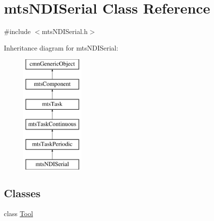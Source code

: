\hypertarget{classmts_n_d_i_serial}{\section{mts\-N\-D\-I\-Serial Class Reference}
\label{classmts_n_d_i_serial}
}


{\ttfamily \#include $<$mts\-N\-D\-I\-Serial.\-h$>$}

Inheritance diagram for mts\-N\-D\-I\-Serial\-:\begin{figure}[H]
\begin{center}
\leavevmode
\includegraphics[height=6.000000cm]{d1/d41/classmts_n_d_i_serial}
\end{center}
\end{figure}
\subsection*{Classes}
\begin{DoxyCompactItemize}
\item 
class \hyperlink{classmts_n_d_i_serial_1_1_tool}{Tool}
\end{DoxyCompactItemize}
